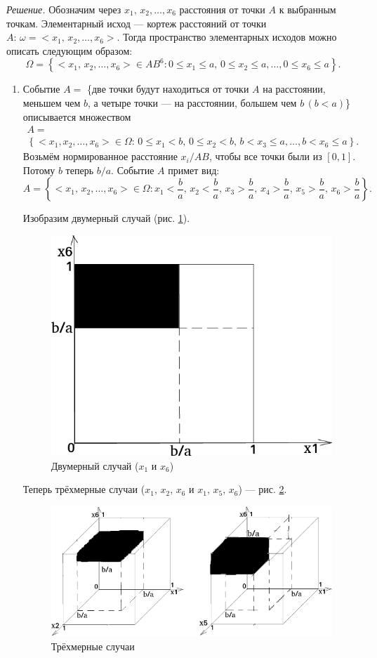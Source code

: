 \textit{Решение.} Обозначим через $x_1, \, x_2, \dotsc, x_6$ расстояния от точки $A$ к выбранным точкам.
Элементарный исход ---  кортеж расстояний от точки $A: \, \omega = <x_1, \, x_2, \dotsc, x_6>$.
Тогда пространство элементарных исходов можно описать следующим образом:
$$ \Omega =
\left\{ <x_1, \, x_2, \dotsc, x_6> \in AB^6:
0 \leq x_1 \leq a, \,
0 \leq x_2 \leq a, \dotsc,
0 \leq x_6 \leq a \right\}.$$

\begin{enumerate}[label=\alph*)]
\item Событие $A =$
\{две точки будут находиться от точки $A$ на расстоянии,
меньшем чем $b$, а четыре точки --- на расстоянии,
большем чем $b \, \left( b<a \right) $\}
описывается множеством
\begin{equation*}
\begin{split}
A = \\
\left\{ <x_1, x_2, \dotsc, x_6> \in \Omega: \,
0 \leq x_1 < b, \,
0 \leq x_2 < b, \,
b < x_3 \leq a, \dotsc,
b < x_6 \leq a \right\}.
\end{split}
\end{equation*}
Возьмём нормированное расстояние $x_i/AB$, чтобы все точки были из $ \left[ 0, 1 \right] $.
Потому $b$ теперь $b/a$.
Событие $A$ примет вид:
$$A =
\left\{ <x_1, \, x_2, \dotsc, x_6> \in \Omega:
x_1 < \frac{b}{a}, \,
x_2 < \frac{b}{a}, \,
x_3 > \frac{b}{a}, \,
x_4 > \frac{b}{a}, \,
x_5 > \frac{b}{a}, \,
x_6 > \frac{b}{a} \right\}.$$

Изобразим двумерный случай (рис. \ref{fig:47}).

\begin{figure}[h!]
  \centering
  \includegraphics[width=.4\textwidth]{./pictures/4_7.png}
  \caption{Двумерный случай ($x_1$ и $x_6$)}
  \label{fig:47}
\end{figure}

Теперь трёхмерные случаи ($x_1, \, x_2, \, x_6$ и $x_1, \, x_5, \, x_6$) --- рис. \ref{fig:471}.

\begin{figure}[h!]
  \centering
  \includegraphics[width=.7\textwidth]{./pictures/4_7_1.png}
  \caption{Трёхмерные случаи}
  \label{fig:471}
\end{figure}


\end{enumerate}
